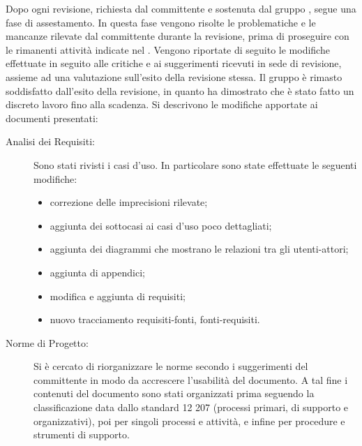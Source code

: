 Dopo ogni revisione, richiesta dal committente e sostenuta dal gruppo \groupname{}, segue una fase di assestamento. In questa fase vengono risolte le problematiche e le mancanze rilevate dal committente durante la revisione, prima di proseguire con le rimanenti attività indicate nel .
Vengono riportate di seguito le modifiche effettuate in seguito alle critiche e ai suggerimenti ricevuti in sede di revisione, assieme ad una valutazione sull'esito della revisione stessa.
Il gruppo è rimasto soddisfatto dall'esito della revisione, in quanto ha dimostrato che è stato fatto un discreto lavoro fino alla scadenza.
Si descrivono le modifiche apportate ai documenti presentati:
\begin{description}
\item[Analisi dei Requisiti:] Sono stati rivisti i casi d'uso. In particolare sono state effettuate le seguenti modifiche:
\begin{itemize}
\item correzione delle imprecisioni rilevate;
\item aggiunta dei sottocasi ai casi d'uso poco dettagliati;
\item aggiunta dei diagrammi che mostrano le relazioni tra gli utenti-attori;
\item aggiunta di appendici;
\item modifica e aggiunta di requisiti;
\item nuovo tracciamento requisiti-fonti, fonti-requisiti.
\end{itemize}
\item[Norme di Progetto:] Si è cercato di riorganizzare le norme secondo i suggerimenti del committente in modo da accrescere l'usabilità del documento. A tal fine i contenuti del documento sono stati organizzati prima seguendo la classificazione data dallo standard 12 207 (processi primari, di supporto e organizzativi), poi per singoli processi e attività, e infine per procedure e strumenti di supporto.

\end{description}
